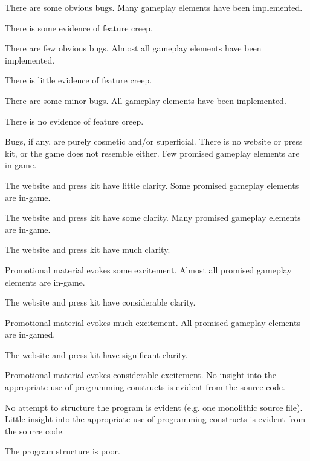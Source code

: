 \documentclass{../fal_assignment}
\begin{document}
\begin{markingrubric}
            \par There are some obvious bugs.
        \grade Many gameplay elements have been implemented.
            \par There is some evidence of feature creep.
            \par There are few obvious bugs.
        \grade Almost all gameplay elements have been implemented.
            \par There is little evidence of feature creep.
            \par There are some minor bugs.
        \grade All gameplay elements have been implemented.
            \par There is no evidence of feature creep.
            \par Bugs, if any, are purely cosmetic and/or superficial.
%            
        \grade\fail There is no website or press kit, or the game does not resemble either.
        \grade Few promised gameplay elements are in-game.
            \par The website and press kit have little clarity.
        \grade Some promised gameplay elements are in-game.
            \par The website and press kit have some clarity.
        \grade Many promised gameplay elements are in-game.
            \par The website and press kit have much clarity.
            \par Promotional material evokes some excitement.
        \grade Almost all promised gameplay elements are in-game.
            \par The website and press kit have considerable clarity.
            \par Promotional material evokes much excitement.
        \grade All promised gameplay elements are in-gamed.
            \par The website and press kit have significant clarity.
            \par Promotional material evokes considerable excitement.
%
        \grade\fail No insight into the appropriate use of programming constructs is evident from the source code.
            \par No attempt to structure the program is evident (e.g. one monolithic source file).
        \grade Little insight into the appropriate use of programming constructs is evident from the source code.
            \par The program structure is poor.

\end{markingrubric}
\end{document}
